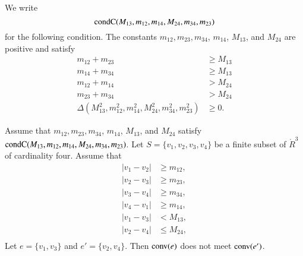 \begin{tarskidata}
\begin{tarski}
\begin{definition}[$\op{condC}$]
We write
	$$
	{\operatorname{condC}}(M_{13},m_{12},m_{14},M_{24},m_{34},m_{23})
	$$
for the following condition.
The constants  $m_{12},m_{23},m_{34}$,  $m_{14}$, 
$M_{13}$, and $M_{24}$ are positive and satisfy
	$$
	\begin{array}{rll}
	m_{12} + m_{23} &\ge M_{13}\\
	m_{14} + m_{34} &\ge M_{13}\\
	m_{12} + m_{14} &> M_{24}\\
	m_{23} + m_{34} &> M_{24}\\
	\Delta(M^2_{13},m^2_{12},m^2_{14},M^2_{24},
		m^2_{34},m^2_{23}) &\ge 0.
	\end{array}
	$$
\end{definition}
\end{tarski}



\begin{tarski}

\begin{lemma} 
Assume that  $m_{12},m_{23},m_{34}$,  $m_{14}$, 
$M_{13}$, and $M_{24}$ satisfy 
  ${\operatorname{condC}}(M_{13},m_{12},m_{14},M_{24},m_{34},m_{23})$.
Let $S=\{v_1,v_2,v_3,v_4\}$ be a finite subset
of $\ring{R}^3$ of cardinality four.
Assume that
	$$
	\begin{array}{lll}
	|v_1-v_2|&\ge m_{12},\\
	|v_2-v_3|&\ge m_{23},\\
	|v_3-v_4|&\ge m_{34},\\
	|v_4-v_1|&\ge m_{14},\\
	|v_1-v_3|&< M_{13},\\
	|v_2-v_4|&\le M_{24},\\
	\end{array}
	$$  
Let $e = \{v_1,v_3\}$ and $e'=\{v_2,v_4\}$.
Then ${\operatorname{conv}} (e)$ does not meet ${\operatorname{conv}} (e')$.    	
\end{lemma}



\end{tarski}
\end{tarskidata}
